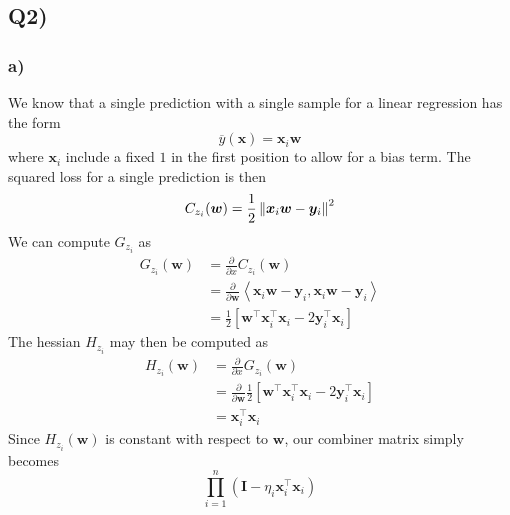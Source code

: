 \subsection*{{\bf Q2)}}
\subsubsection*{{\bf a)}}
We know that a single prediction with a single sample for a linear regression has the form
\[
    \overline{y} (\bm{x}) = \bm{x}_{i} \bm{w}
\]
where $\bm{x}_{i}$ include a fixed $1$ in the first position to allow for a bias term. The squared loss for a single prediction is then
\[
    C_{z_{i}} (\bm{w}) = \frac{1}{2} \left\lVert\bm{x}_{i} \bm{w} - \bm{y}_{i}\right\rVert^2
\]
We can compute $G_{z_{i}}$ as
\begin{align*}
    G_{z_{i}} (\bm{w}) &= \frac{\partial}{\partial x} C_{z_{i}} (\bm{w}) \\
    &= \frac{\partial}{\partial \bm{w}} \left\langle \bm{x}_{i} \bm{w} - \bm{y}_{i}, \bm{x}_{i} \bm{w} - \bm{y}_{i} \right\rangle \\
    &= \frac{1}{2} \left[ \bm{w}^{\top} \bm{x}_{i}^{\top} \bm{x}_{i} - 2 \bm{y}_{i}^{\top} \bm{x}_{i} \right]
\end{align*}
The hessian $H_{z_{i}}$ may then be computed as
\begin{align*}
    H_{z_{i}} (\bm{w}) &= \frac{\partial}{\partial x} G_{z_{i}} (\bm{w}) \\
    &= \frac{\partial}{\partial \bm{w}} \frac{1}{2} \left[ \bm{w}^{\top} \bm{x}_{i}^{\top} \bm{x}_{i} - 2 \bm{y}_{i}^{\top} \bm{x}_{i} \right] \\
    &= \bm{x}_{i}^{\top} \bm{x}_{i}
\end{align*}
Since $H_{z_{i}} (\bm{w})$ is constant with respect to $\bm{w}$, our combiner matrix simply becomes
\[
    \prod_{i=1}^{n} \left( \bm{I} - \eta_{i} \bm{x}_{i}^{\top} \bm{x}_{i} \right)
\]

